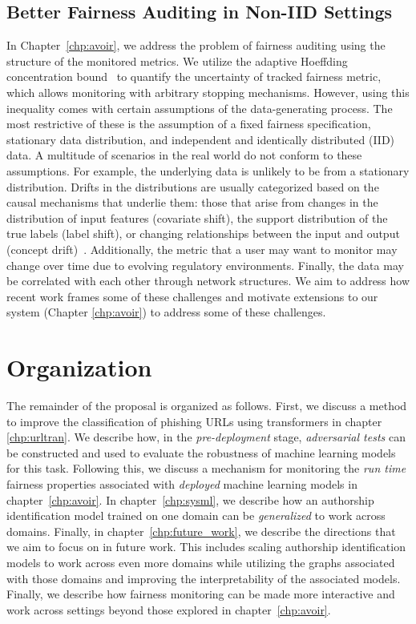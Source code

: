 \subsection{Better Fairness Auditing in Non-IID Settings}
In Chapter~\ref{chp:avoir}, we address the problem of fairness auditing using the structure of the monitored metrics.
We utilize the adaptive Hoeffding concentration bound~\cite{zhao2016adaptive} to quantify the uncertainty of tracked fairness metric, which allows monitoring with arbitrary stopping mechanisms.
However, using this inequality comes with certain assumptions of the data-generating process.
The most restrictive of these is the assumption of a fixed fairness specification, stationary data distribution, and independent and identically distributed (IID) data.
A multitude of scenarios in the real world do not conform to these assumptions.
For example, the underlying data is unlikely to be from a stationary distribution.
Drifts in the distributions are usually categorized based on the causal mechanisms that underlie them:
those that arise from changes in the distribution of input features (covariate shift), the support distribution of the true labels (label shift), or changing relationships between the input and output (concept drift)~\citep{huyen2022designing}.
Additionally, the metric that a user may want to monitor may change over time due to evolving regulatory environments.
Finally, the data may be correlated with each other through network structures.
We aim to address how recent work frames some of these challenges and motivate extensions to our system \AVOIRmethodname (Chapter \ref{chp:avoir}) to address some of these challenges.

\section{Organization}
The remainder of the proposal is organized as follows. 
First, we discuss a method to improve the classification of phishing URLs using transformers in chapter \ref{chp:urltran}.
We describe how, in the \textit{pre-deployment} stage, \textit{adversarial tests} can be constructed and used to evaluate the robustness of machine learning models for this task.
Following this, we discuss a mechanism for monitoring the \textit{run time} fairness properties associated with \textit{deployed} machine learning models in chapter~\ref{chp:avoir}.
In chapter~\ref{chp:sysml}, we describe how an authorship identification model trained on one domain can be \textit{generalized} to work across domains.
Finally, in chapter~\ref{chp:future_work}, we describe the directions that we aim to focus on in future work. 
This includes scaling authorship identification models to work across even more domains while utilizing the graphs associated with those domains and improving the interpretability of the associated models.
Finally, we describe how fairness monitoring can be made more interactive and work across settings beyond those explored in chapter~\ref{chp:avoir}.


\endinput